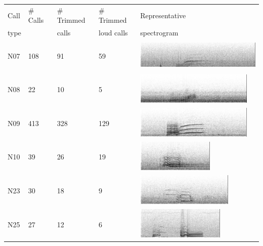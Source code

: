 \begin{table}
\begin{tabular}{|l|l|l|l|l|}
\hline
Call     &  \# Calls  & \# Trimmed & \# Trimmed         &  Representative  \\
type     &            & calls      & loud calls         &  spectrogram    \\
\hline
 N07     &   108      &             91  &   59                    &  \includegraphics[height=1.5cm] {figures/catalog/A08-N07-071110-D013-01151.png} \\ \hline
 N08     &   22       &             10  &    5                    &  \includegraphics[height=1.5cm] {figures/catalog/A04-N08-071906-D020-13145.png} \\ \hline
 N09     &   413      &            328  &  129                    &  \includegraphics[height=1.5cm] {figures/catalog/A12-N09-070102-D005-14103.png} \\ \hline
 N10     &   39       &             26  &   19                    &  \includegraphics[height=1.5cm] {figures/catalog/A36-N10-063002-D005-10954.png} \\ \hline
 N23     &   30       &             18  &    9                    &  \includegraphics[height=1.5cm] {figures/catalog/I31-N23-070706-D011-10950.png} \\ \hline
 N25     &   27       &             12  &    6                    &  \includegraphics[height=1.5cm] {figures/catalog/I15-N25-081206-D044-02059.png} \\ \hline

\end{tabular}
\end{table}
